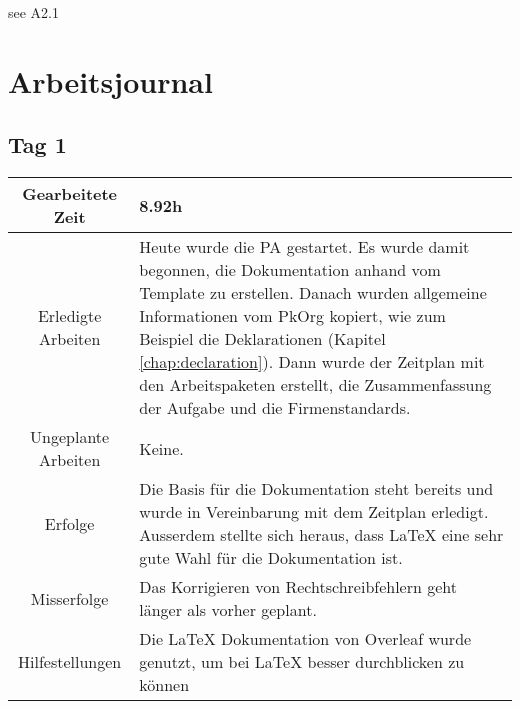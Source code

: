  see A2.1
\chapter{Arbeitsjournal}

\section{Tag 1}
\begin{tabularx}{\textwidth}[H]{|c|X|}
  \hline
  Gearbeitete Zeit & 8.92h \\ \hline
  Erledigte Arbeiten & Heute wurde die PA gestartet. Es wurde damit begonnen, die Dokumentation anhand vom Template
  \cite{Buhler_ipa-template_2022} zu erstellen. Danach wurden allgemeine Informationen vom PkOrg kopiert, wie zum
  Beispiel die Deklarationen (Kapitel \ref{chap:declaration}).
  Dann wurde der Zeitplan mit den Arbeitspaketen erstellt, die Zusammenfassung der Aufgabe und die
  Firmenstandards. \\ \hline
  Ungeplante Arbeiten & Keine. \\ \hline
  Erfolge & Die Basis für die Dokumentation steht bereits und wurde in Vereinbarung mit dem Zeitplan erledigt. Ausserdem stellte
  sich heraus, dass LaTeX eine sehr gute Wahl für die Dokumentation ist.
  \\ \hline
  Misserfolge & Das Korrigieren von Rechtschreibfehlern geht länger als vorher geplant.  \\ \hline
  Hilfestellungen & Die LaTeX Dokumentation von Overleaf \cite{overleaf} wurde genutzt, um bei LaTeX besser durchblicken zu
  können \\ \hline
\end{tabularx}

\newpage

